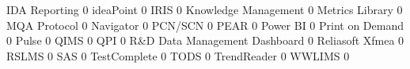 \documentclass{article}
\begin{document}
\begin{Schunk}
\begin{Soutput}
  IDA Reporting                                                                        0
  ideaPoint                                                                            0
  IRIS                                                                                 0
  Knowledge Management                                                                 0
  Metrics Library                                                                      0
  MQA Protocol                                                                         0
  Navigator                                                                            0
  PCN/SCN                                                                              0
  PEAR                                                                                 0
  Power BI                                                                             0
  Print on Demand                                                                      0
  Pulse                                                                                0
  QIMS                                                                                 0
  QPI                                                                                  0
  R&D Data Management Dashboard                                                        0
  Reliasoft Xfmea                                                                      0
  RSLMS                                                                                0
  SAS                                                                                  0
  TestComplete                                                                         0
  TODS                                                                                 0
  TrendReader                                                                          0
  WWLIMS                                                                               0
                                                           

\end{Soutput}
\end{Schunk}
\end{document}
